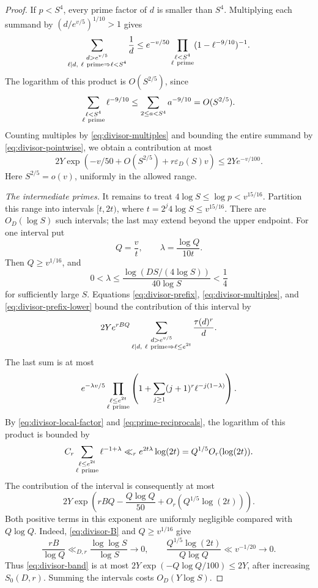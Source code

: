 \begin{proof}
If \(p<S^4\), every prime factor of \(d\) is smaller than \(S^4\).
Multiplying each summand by
\((d/e^{v/5})^{1/10}>1\) gives
\[
 \sum_{\substack{d>e^{v/5}\\
             \ell\mid d,\ \ell\ {\rm prime}\Rightarrow\ell<S^4}}
       \frac1d
 \le e^{-v/50}
       \prod_{\substack{\ell<S^4\\\ell\ {\rm prime}}}
                      (1-\ell^{-9/10})^{-1}.
\]
The logarithm of this product is \(O(S^{2/5})\), since
\[
 \sum_{\substack{\ell<S^4\\\ell\ {\rm prime}}}\ell^{-9/10}
 \le\sum_{2\le a<S^4}a^{-9/10}=O(S^{2/5}).
\]
Counting multiples by \eqref{eq:divisor-multiples} and bounding the
entire summand by \eqref{eq:divisor-pointwise}, we obtain a contribution
at most
\begin{equation}\label{eq:divisor-small-contribution}
 2Y\exp\left(-v/50+O(S^{2/5})+
                         r\varepsilon_D(S)v\right)
 \le 2Ye^{-v/100}.
\end{equation}
Here \(S^{2/5}=o(v)\), uniformly in the allowed range.

\smallskip
\noindent\emph{The intermediate primes.}
It remains to treat
\(4\log S\le\log p<v^{15/16}\).
Partition this range into intervals \([t,2t)\), where
\(t=2^j4\log S\le v^{15/16}\).
There are \(O_D(\log S)\) such intervals; the last may extend beyond
the upper endpoint. For one interval put
\[
 Q=\frac vt,\qquad \lambda=\frac{\log Q}{10t}.
\]
Then \(Q\ge v^{1/16}\), and
\[
 0<\lambda
 \le\frac{\log(DS/(4\log S))}{40\log S}<\frac14
\]
for sufficiently large \(S\).
Equations \eqref{eq:divisor-prefix},
\eqref{eq:divisor-multiples}, and \eqref{eq:divisor-prefix-lower}
bound the contribution of this interval by
\[
 2Ye^{rBQ}
 \sum_{\substack{d>e^{v/5}\\
           \ell\mid d,\ \ell\ {\rm prime}\Rightarrow\ell\le e^{2t}}}
       \frac{\tau(d)^r}{d}.
\]
The last sum is at most
\[
 e^{-\lambda v/5}
 \prod_{\substack{\ell\le e^{2t}\\\ell\ {\rm prime}}}
 \left(1+\sum_{j\ge1}(j+1)^r\ell^{-j(1-\lambda)}\right).
\]
By \eqref{eq:divisor-local-factor} and
\eqref{eq:prime-reciprocals}, the logarithm of this product is
bounded by
\[
 C_r\sum_{\substack{\ell\le e^{2t}\\\ell\ {\rm prime}}}
                   \ell^{-1+\lambda}
 \ll_r e^{2t\lambda}\log(2t)
 =Q^{1/5}O_r(\log(2t)).
\]
The contribution of the interval is consequently at most
\begin{equation}\label{eq:divisor-band}
 2Y\exp\left(rBQ-\frac{Q\log Q}{50}
                         +O_r(Q^{1/5}\log(2t))\right).
\end{equation}
Both positive terms in this exponent are uniformly negligible compared
with \(Q\log Q\). Indeed, \eqref{eq:divisor-B} and
\(Q\ge v^{1/16}\) give
\[
 \frac{rB}{\log Q}
 \ll_{D,r}\frac{\log\log S}{\log S}\longrightarrow0,
 \qquad
 \frac{Q^{1/5}\log(2t)}{Q\log Q}
 \ll v^{-1/20}\longrightarrow0.
\]
Thus \eqref{eq:divisor-band} is at most
\(2Y\exp(-Q\log Q/100)\le2Y\), after increasing \(S_0(D,r)\).
Summing the intervals costs \(O_D(Y\log S)\).


\end{proof}

